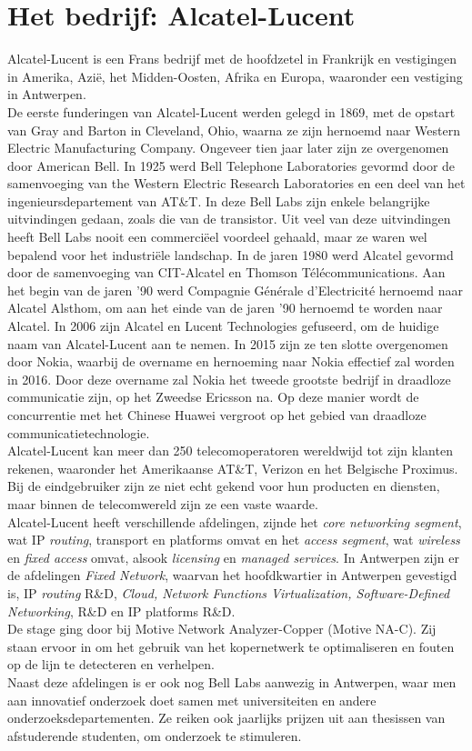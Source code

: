 \documentclass[10pt,a4paper]{article}
\begin{document}
\section{Het bedrijf: Alcatel-Lucent}
\label{bedrijf}
Alcatel-Lucent is een Frans bedrijf met de hoofdzetel in Frankrijk en vestigingen in Amerika, Azi\"e, het Midden-Oosten, Afrika en Europa, waaronder een vestiging in Antwerpen. \\
De eerste funderingen van Alcatel-Lucent werden gelegd in 1869, met de opstart van Gray and Barton in Cleveland, Ohio, waarna ze zijn hernoemd naar Western Electric Manufacturing Company. Ongeveer tien jaar later zijn ze overgenomen door American Bell. In 1925 werd Bell Telephone Laboratories gevormd door de samenvoeging van the Western Electric Research Laboratories en een deel van het ingenieursdepartement van AT\&T. In deze Bell Labs zijn enkele belangrijke uitvindingen gedaan, zoals die van de transistor. Uit veel van deze uitvindingen heeft Bell Labs nooit een commerci\"eel voordeel gehaald, maar ze waren wel bepalend voor het industri\"ele landschap. In de jaren 1980 werd Alcatel gevormd door de samenvoeging van CIT-Alcatel en Thomson T\'el\'ecommunications. Aan het begin van de jaren '90 werd Compagnie G\'en\'erale d'Electricit\'e hernoemd naar Alcatel Alsthom, om aan het einde van de jaren '90 hernoemd te worden naar Alcatel. In 2006 zijn Alcatel en Lucent Technologies gefuseerd, om de huidige naam van Alcatel-Lucent aan te nemen. In 2015 zijn ze ten slotte overgenomen door Nokia, waarbij de overname en hernoeming naar Nokia effectief zal worden in 2016. Door deze overname zal Nokia het tweede grootste bedrijf in draadloze communicatie zijn, op het Zweedse Ericsson na. Op deze manier wordt de concurrentie met het Chinese Huawei vergroot op het gebied van draadloze communicatietechnologie.\\
Alcatel-Lucent kan meer dan 250 telecomoperatoren wereldwijd tot zijn klanten rekenen, waaronder het Amerikaanse AT\&T, Verizon en het Belgische Proximus. Bij de eindgebruiker zijn ze niet echt gekend voor hun producten en diensten, maar binnen de telecomwereld zijn ze een vaste waarde.\\
Alcatel-Lucent heeft verschillende afdelingen, zijnde het \textit{core networking segment}, wat IP \textit{routing}, transport en platforms omvat en het \textit{access segment}, wat \textit{wireless} en \textit{fixed access} omvat, alsook \textit{licensing} en \textit{managed services}. In Antwerpen zijn er de afdelingen \textit{Fixed Network}, waarvan het hoofdkwartier in Antwerpen gevestigd is, IP \textit{routing} R\&D, \textit{Cloud, Network Functions Virtualization, Software-Defined Networking}, R\&D en IP platforms R\&D.\\
De stage ging door bij Motive Network Analyzer-Copper (Motive NA-C). Zij staan ervoor in om het gebruik van het kopernetwerk te optimaliseren en fouten op de lijn te detecteren en verhelpen.\\
Naast deze afdelingen is er ook nog Bell Labs aanwezig in Antwerpen, waar men aan innovatief onderzoek doet samen met universiteiten en andere onderzoeksdepartementen. Ze reiken ook jaarlijks prijzen uit aan thesissen van afstuderende studenten, om onderzoek te stimuleren. 
\end{document}
